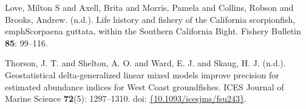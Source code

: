 \documentclass[12pt,]{article}
\begin{document}
\leavevmode\hypertarget{ref-Love1987}{}%
Love, Milton S and Axell, Brita and Morris, Pamela and Collins, Robson
and Brooks, Andrew. (n.d.). Life history and fishery of the California
scorpionfish,\\
emphScorpaena guttata, within the Southern California Bight. Fishery
Bulletin \textbf{85}: 99--116.

\leavevmode\hypertarget{ref-Thorson2015}{}%
Thorson, J. T. and Shelton, A. O. and Ward, E. J. and Skaug, H. J.
(n.d.). Geostatistical delta-generalized linear mixed models improve
precision for estimated abundance indices for West Coast groundfishes.
ICES Journal of Marine Science \textbf{72}(5): 1297--1310. doi:
\href{https://doi.org/\%7B10.1093/icesjms/fsu243\%7D}{\{10.1093/icesjms/fsu243\}}.
\end{document}
